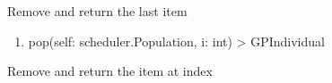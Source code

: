 \documentclass[letterpaper,10pt,english]{sphinxmanual}
\begin{document}
\begin{fulllineitems}
\begin{fulllineitems}
\sphinxAtStartPar
Remove and return the last item
\begin{enumerate}
%
\setcounter{enumi}{1}
\item {} 
\sphinxAtStartPar
pop(self: scheduler.Population, i: int) \sphinxhyphen{}\textgreater{} GPIndividual

\end{enumerate}

\sphinxAtStartPar
Remove and return the item at index 

\end{fulllineitems}


\end{fulllineitems}

\end{document}
